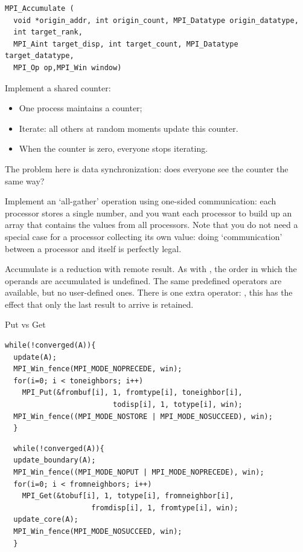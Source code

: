 \begin{verbatim}
MPI_Accumulate (
  void *origin_addr, int origin_count, MPI_Datatype origin_datatype, 
  int target_rank,
  MPI_Aint target_disp, int target_count, MPI_Datatype target_datatype,
  MPI_Op op,MPI_Win window)
\end{verbatim}

\begin{exercise}
  \label{ex:countdown}

  Implement a shared counter:
  \begin{itemize}
  \item One process maintains a counter;
  \item Iterate: all others at random moments update this counter.
  \item When the counter is zero, everyone stops iterating.
  \end{itemize}
  The problem here is data synchronization: does everyone see the
  counter the same way?
\end{exercise}

\begin{exercise}
  Implement an `all-gather' operation using one-sided communication:
  each processor stores a single number, and you want each processor
  to build up an array that contains the values from all
  processors. Note that you do not need a special case for a processor
  collecting its own value: doing `communication' between a processor
  and itself is perfectly legal.
\end{exercise}

Accumulate is a reduction with remote result. As with , the 
order in which the operands are accumulated is undefined. 
The same predefined operators are available, but no
user-defined ones. There is one extra operator: ,
this has the effect that only the last result to arrive is retained.

 {Put vs Get}

\begin{verbatim}
while(!converged(A)){ 
  update(A); 
  MPI_Win_fence(MPI_MODE_NOPRECEDE, win); 
  for(i=0; i < toneighbors; i++) 
    MPI_Put(&frombuf[i], 1, fromtype[i], toneighbor[i], 
                         todisp[i], 1, totype[i], win); 
  MPI_Win_fence((MPI_MODE_NOSTORE | MPI_MODE_NOSUCCEED), win); 
  } 
\end{verbatim}
\begin{verbatim}
  while(!converged(A)){ 
  update_boundary(A); 
  MPI_Win_fence((MPI_MODE_NOPUT | MPI_MODE_NOPRECEDE), win); 
  for(i=0; i < fromneighbors; i++) 
    MPI_Get(&tobuf[i], 1, totype[i], fromneighbor[i], 
                    fromdisp[i], 1, fromtype[i], win); 
  update_core(A); 
  MPI_Win_fence(MPI_MODE_NOSUCCEED, win); 
  } 
\end{verbatim}

